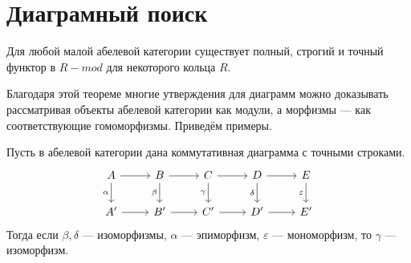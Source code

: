 \documentclass[../main.tex]{subfiles}
\begin{document}
\section{Диаграмный поиск}
\begin{to_thr}
Для любой малой абелевой категории существует полный, строгий и точный функтор в $R-mod$ для некоторого кольца $R$.
\end{to_thr}
Благодаря этой теореме многие утверждения для диаграмм можно доказывать рассматривая объекты абелевой категории как модули, а морфизмы --- как соответствующие гомоморфизмы. Приведём примеры.

\begin{to_suj}\label{B:five_lemma}
Пусть в абелевой категории дана коммутативная диаграмма с точными строками.
\begin{equation*}
    \begin{tikzcd}
	A & B & C & D & E \\
	{A'} & {B'} & {C'} & {D'} & {E'}
	\arrow[from=1-1, to=1-2]
	\arrow[from=1-2, to=1-3]
	\arrow[from=1-3, to=1-4]
	\arrow[from=1-4, to=1-5]
	\arrow[from=2-1, to=2-2]
	\arrow[from=2-2, to=2-3]
	\arrow[from=2-3, to=2-4]
	\arrow[from=2-4, to=2-5]
	\arrow["\alpha"', from=1-1, to=2-1]
	\arrow["\beta"', from=1-2, to=2-2]
	\arrow["\gamma"', from=1-3, to=2-3]
	\arrow["\delta"', from=1-4, to=2-4]
	\arrow["\varepsilon"', from=1-5, to=2-5]
\end{tikzcd}
\end{equation*}
Тогда если $\beta, \delta$ --- изоморфизмы, $\alpha$ --- эпиморфизм, $\varepsilon$ --- мономорфизм, то $\gamma$ --- изоморфизм.
\end{to_suj}
\end{document}
